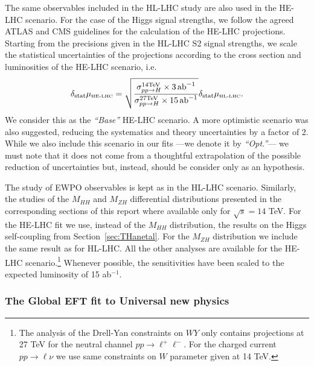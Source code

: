 The same observables included in the HL-LHC study are also used in the HE-LHC scenario. 
For the case of the Higgs signal strengths, we follow the agreed ATLAS and CMS guidelines for the calculation of
the HE-LHC projections.
Starting from the precisions given in the HL-LHC S2 signal strengths, we scale the statistical uncertainties of the projections
according to the cross section and luminosities of the HE-LHC scenario, i.e.
%
\begin{equation}
\delta_{\mathrm{stat}} \mu_{\mbox{\tiny HE-LHC}} = \sqrt{\frac{\sigma_{pp\to H}^{\mathrm{14 TeV}}\times 3~\!\mathrm{ab}^{-1}}{\sigma_{pp\to H}^{\mathrm{27 TeV}}\times 15~\! \mathrm{ab}^{-1}}} \delta_{\mathrm{stat}} \mu_{\mbox{\tiny HL-LHC}} .
\end{equation}
%
We consider this as the {\it ``Base''} HE-LHC scenario. A more optimistic scenario was also suggested, reducing the 
systematics and theory uncertainties by a factor of 2. While we also include this scenario in our fits ---we denote it by {\it ``Opt.''}---
we must note that it does not come from a thoughtful extrapolation of the possible reduction of uncertainties but, instead, 
should be consider only as an hypothesis.

The study of EWPO observables is kept as in the HL-LHC scenario. Similarly, the studies of the $M_{HH}$ and $M_{ZH}$ differential distributions presented in the corresponding sections of this report where available only for $\sqrt{s}=14$ TeV. For the HE-LHC fit we use, instead of the $M_{HH}$ distribution, the results on the Higgs self-coupling from Section~\ref{sec:THanetal}. For  the $M_{ZH}$ distribution we include the same result as for HL-LHC. All the other analyses are available for the HE-LHC scenario.\footnote{The analysis of the Drell-Yan constraints on $WY$ only contains projections at 27 TeV for the neutral channel $pp\to \ell^+ \ell^-$. For the charged current $pp\to \ell \nu$ we use same constraints on $W$ parameter given at 14 TeV.} Whenever possible, the sensitivities have been scaled to the
expected luminosity of 15 ab$^{-1}$.


\subsubsection{The Global EFT fit to Universal new physics}
\label{sec:results}

